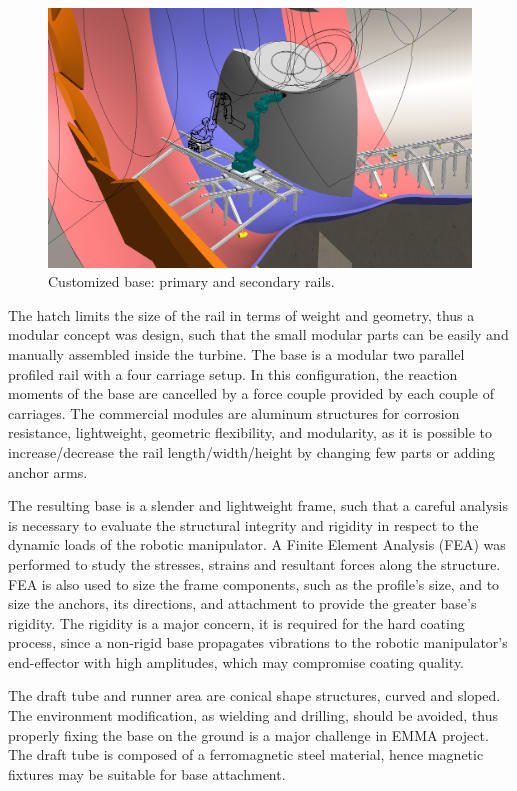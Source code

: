 \begin{figure}
	\centering
	\includegraphics[width=.8\columnwidth]{figs/mecanica/EMMA_Base_Secundaria_01.PNG}
    \caption{Customized base: primary and secondary rails.}
    \label{fig:base}
\end{figure}

The hatch limits the size of the rail in terms of weight and geometry, thus a
modular concept was design, such that the small modular parts can be easily and
manually assembled inside the turbine. The base is a modular two parallel
profiled rail  %
with a four carriage setup. In this configuration, the reaction moments of the
base are cancelled by a force couple provided by each couple of carriages. The
commercial modules are aluminum structures for corrosion resistance,
lightweight, geometric flexibility, and modularity, as it is possible to
increase/decrease the rail length/width/height by changing few parts or adding
anchor arms.

The resulting base is a slender and lightweight frame, such that a careful
analysis is necessary to evaluate the structural integrity and rigidity in
respect to the dynamic loads of the robotic manipulator. A Finite Element
Analysis (FEA) was performed to study the stresses, strains and resultant forces
along the structure. FEA is also used to size the frame components, such as
the profile's size, and to size the anchors, its directions, and attachment to
provide the greater base's rigidity. The rigidity is a major concern, it is
required for the hard coating process, since a non-rigid base propagates
vibrations to the robotic manipulator's end-effector with high amplitudes, which
may compromise coating quality.

The draft tube and runner area are conical shape structures, curved and
sloped. The environment modification, as wielding and drilling, should be
avoided, thus properly fixing the base on the ground is a major challenge in
EMMA project. The draft tube is composed of a ferromagnetic steel material,
hence magnetic fixtures may be suitable for base attachment. 

